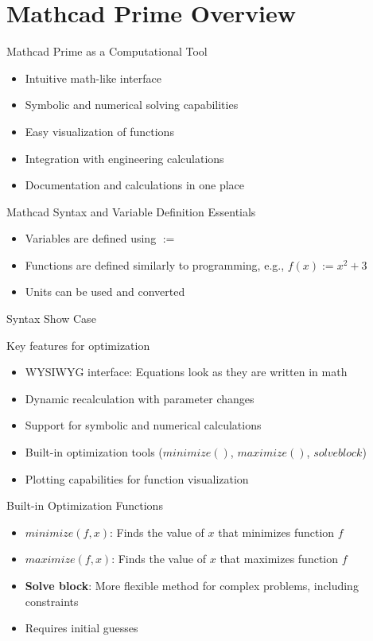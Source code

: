 \documentclass{beamer}
\begin{document}
\section{Mathcad Prime Overview}

\begin{frame}{Mathcad Prime as a Computational Tool}
\begin{itemize}
\item Intuitive math-like interface
\item Symbolic and numerical solving capabilities
\item Easy visualization of functions
\item Integration with engineering calculations
\item Documentation and calculations in one place
\end{itemize}
\end{frame}

\begin{frame}{Mathcad Syntax and Variable Definition Essentials}
\begin{itemize}
\item Variables are defined using $:=$
\item Functions are defined similarly to programming, e.g., $f(x) := x^2 + 3$
\item Units can be used and converted
\end{itemize}
\end{frame}

\begin{frame}{Syntax Show Case}
\end{frame}

\begin{frame}{Key features for optimization}
\begin{itemize}
\item WYSIWYG interface: Equations look as they are written in math
\item Dynamic recalculation with parameter changes
\item Support for symbolic and numerical calculations
\item Built-in optimization tools ($minimize()$, $maximize()$, $solve block$)
\item Plotting capabilities for function visualization
\end{itemize}
\end{frame}

\begin{frame}{Built-in Optimization Functions}
\begin{itemize}
\item $minimize(f, x)$: Finds the value of $x$ that minimizes function $f$
\item $maximize(f, x)$: Finds the value of $x$ that maximizes function $f$
\item \textbf{Solve block}: More flexible method for complex problems, including constraints
\item Requires initial guesses
\end{itemize}
\end{frame}
\end{document}
